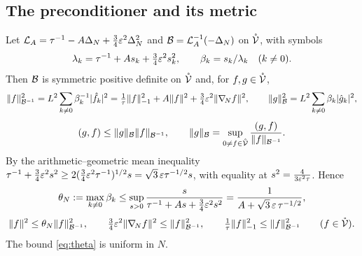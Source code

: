 \subsection{The preconditioner and its metric}
Let $\mathcal{L}_A=\tau^{-1}-A\Delta_N+\frac34\varepsilon^2\Delta_N^2$ and $\mathcal{B}=\mathcal{L}_A^{-1}(-\Delta_N)$ on $\mathring{\mathcal{V}}$, with symbols
\begin{equation}\label{eq:symbols}
\lambda_k=\tau^{-1}+As_k+\tfrac34\varepsilon^2s_k^2,\qquad \beta_k=s_k/\lambda_k\quad(k\ne0).
\end{equation}
Then $\mathcal{B}$ is symmetric positive definite on $\mathring{\mathcal{V}}$ and, for $f,g\in\mathring{\mathcal{V}}$,
\begin{equation}\label{eq:Bnorm}
\lVert f\rVert_{\mathcal{B}^{-1}}^2=L^2\sum_{k\ne0}\beta_k^{-1}|\hat f_k|^2=\tfrac1\tau\lVert f\rVert_{-1}^2+A\lVert f\rVert^2+\tfrac34\varepsilon^2\lVert \nabla_{\!N} f\rVert^2,\qquad \lVert g\rVert_{\mathcal{B}}^2=L^2\sum_{k\ne0}\beta_k|\hat g_k|^2,
\end{equation}
\begin{equation}\label{eq:duality}
(g,f)\le\lVert g\rVert_{\mathcal{B}}\lVert f\rVert_{\mathcal{B}^{-1}},\qquad \lVert g\rVert_{\mathcal{B}}=\sup_{0\ne f\in\mathring{\mathcal{V}}}\frac{(g,f)}{\lVert f\rVert_{\mathcal{B}^{-1}}}.
\end{equation}
By the arithmetic--geometric mean inequality $\tau^{-1}+\frac34\varepsilon^2s^2\ge2(\frac34\varepsilon^2\tau^{-1})^{1/2}s=\sqrt3\,\varepsilon\tau^{-1/2}s$, with equality at $s^2=\frac4{3\varepsilon^2\tau}$. Hence
\begin{equation}\label{eq:theta}
\theta_N:=\max_{k\ne0}\beta_k\le\sup_{s>0}\frac{s}{\tau^{-1}+As+\frac34\varepsilon^2s^2}=\frac{1}{A+\sqrt3\,\varepsilon\,\tau^{-1/2}},
\end{equation}
\begin{equation}\label{eq:normequiv}
\lVert f\rVert^2\le\theta_N\lVert f\rVert_{\mathcal{B}^{-1}}^2,\qquad \tfrac34\varepsilon^2\lVert \nabla_{\!N} f\rVert^2\le\lVert f\rVert_{\mathcal{B}^{-1}}^2,\qquad \tfrac1\tau\lVert f\rVert_{-1}^2\le\lVert f\rVert_{\mathcal{B}^{-1}}^2\qquad(f\in\mathring{\mathcal{V}}).
\end{equation}
The bound \eqref{eq:theta} is uniform in $N$.

